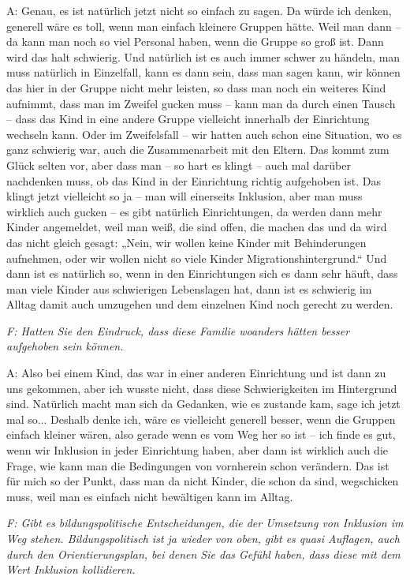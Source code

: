 A: Genau, es ist natürlich jetzt nicht so einfach zu sagen. Da würde ich denken, generell wäre es toll, wenn man einfach kleinere Gruppen hätte. Weil man dann – da kann man noch so viel Personal haben, wenn die Gruppe so groß ist. Dann wird das halt schwierig. Und natürlich ist es auch immer schwer zu händeln, man muss natürlich in Einzelfall, kann es dann sein, dass man sagen kann, wir können das hier in der Gruppe nicht mehr leisten, so dass man noch ein weiteres Kind aufnimmt, dass man im Zweifel gucken muss – kann man da durch einen Tausch – dass das Kind in eine andere Gruppe vielleicht innerhalb der Einrichtung wechseln kann. Oder im Zweifelsfall – wir hatten auch schon eine Situation, wo es ganz schwierig war, auch die Zusammenarbeit mit den Eltern. Das kommt zum Glück selten vor, aber dass man – so hart es klingt – auch mal darüber nachdenken muss, ob das Kind in der Einrichtung richtig aufgehoben ist. Das klingt jetzt vielleicht so ja – man will einerseits Inklusion, aber man muss wirklich auch gucken – es gibt natürlich Einrichtungen, da werden dann mehr Kinder angemeldet, weil man weiß, die sind offen, die machen das und da wird das nicht gleich gesagt: „Nein, wir wollen keine Kinder mit Behinderungen aufnehmen, oder wir wollen nicht so viele Kinder Migrationshintergrund.“ Und dann ist es natürlich so, wenn in den Einrichtungen sich es dann sehr häuft, dass man viele Kinder aus schwierigen Lebenslagen hat, dann ist es schwierig im Alltag damit auch umzugehen und dem einzelnen Kind noch gerecht zu werden. 

\emph{F: Hatten Sie den Eindruck, dass diese Familie woanders hätten besser aufgehoben sein können.}

A: Also bei einem Kind, das war in einer anderen Einrichtung und ist dann zu uns gekommen, aber ich wusste nicht, dass diese Schwierigkeiten im Hintergrund sind. Natürlich macht man sich da Gedanken, wie es zustande kam, sage ich jetzt mal so... Deshalb denke ich, wäre es vielleicht generell besser, wenn die Gruppen einfach kleiner wären, also gerade wenn es vom Weg her so ist -- ich finde es gut, wenn wir Inklusion in jeder Einrichtung haben, aber dann ist wirklich auch die Frage, wie kann man die Bedingungen von vornherein schon verändern. Das ist für mich so der Punkt, dass man da nicht Kinder, die schon da sind, wegschicken muss, weil man es einfach nicht bewältigen kann im Alltag. 

\emph{F: Gibt es bildungspolitische Entscheidungen, die der Umsetzung von Inklusion im Weg stehen. Bildungspolitisch ist ja wieder von oben, gibt es quasi Auflagen, auch durch den Orientierungsplan, bei denen Sie das Gefühl haben, dass diese mit dem Wert Inklusion kollidieren.}

